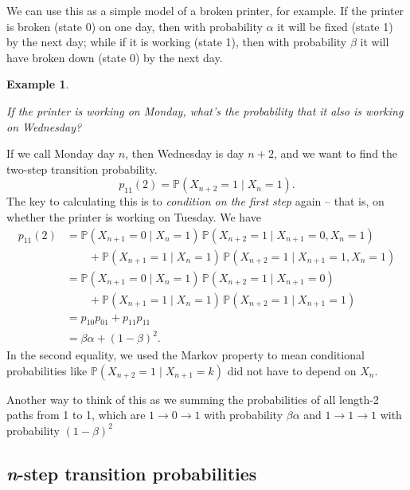 \documentclass[
  a4paper,
]{article}
\theoremstyle{definition}
\theoremstyle{definition}
\newtheorem{example}{Example}[section]
\theoremstyle{definition}
\theoremstyle{remark}
\begin{document}
We can use this as a simple model of a broken printer, for example. If the printer is broken (state 0) on one day, then with probability \(\alpha\) it will be fixed (state 1) by the next day; while if it is working (state 1), then with probability \(\beta\) it will have broken down (state 0) by the next day.

\begin{example}
\protect\hypertarget{exm:printer}{}\label{exm:printer}

\emph{If the printer is working on Monday, what's the probability that it also is working on Wednesday?}

If we call Monday day \(n\), then Wednesday is day \(n+2\), and we want to find the two-step transition probability.
\[ p_{11}(2) = \mathbb P (X_{n+2} = 1 \mid X_n = 1) . \]
The key to calculating this is to \emph{condition on the first step} again -- that is, on whether the printer is working on Tuesday. We have
\begin{align*}
  p_{11}(2) &= \mathbb P (X_{n+1} = 0 \mid X_n = 1)\,\mathbb P (X_{n+2} = 1 \mid X_{n+1} = 0, X_n = 1) \\
  &\qquad{} + \mathbb P (X_{n+1} = 1 \mid X_n = 1)\,\mathbb P (X_{n+2} = 1 \mid X_{n+1} = 1, X_n = 1) \\
  &= \mathbb P (X_{n+1} = 0 \mid X_n = 1)\,\mathbb P (X_{n+2} = 1 \mid X_{n+1} = 0) \\
  &\qquad{} + \mathbb P (X_{n+1} = 1 \mid X_n = 1)\,\mathbb P (X_{n+2} = 1 \mid X_{n+1} = 1) \\
  &= p_{10}p_{01} + p_{11}p_{11} \\
  &= \beta\alpha + (1-\beta)^2 .
\end{align*}
In the second equality, we used the Markov property to mean conditional probabilities like \(\mathbb P(X_{n+2} = 1 \mid X_{n+1} = k)\) did not have to depend on \(X_n\).

Another way to think of this as we summing the probabilities of all length-2 paths from 1 to 1, which are \(1\to 0\to 1\) with probability \(\beta\alpha\) and \(1 \to 1 \to 1\) with probability \((1-\beta)^2\)

\end{example}

\hypertarget{n-step}{%
\subsection{\texorpdfstring{\emph{n}-step transition probabilities}{n-step transition probabilities}}\label{n-step}}
\end{document}
